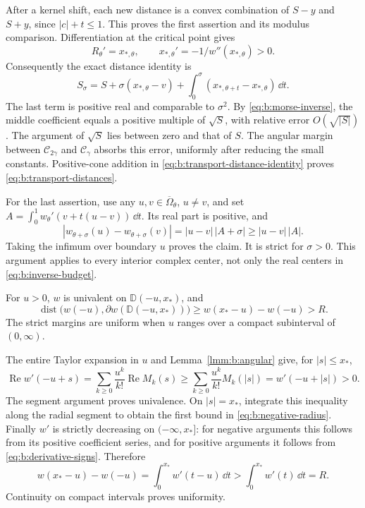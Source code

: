 \begin{prf}
After a kernel shift, each new distance is a convex combination
of $S-y$ and $S+y$, since $|c|+t\leq1$. This proves the first
assertion and its modulus comparison.
Differentiation at the critical point gives
\[
 R_\theta'=x_{*,\theta},\qquad
 x_{*,\theta}'=-1/w''(x_{*,\theta})>0.
\]
Consequently the exact distance identity is
\begin{equation}\label{eq:b:transport-distance-identity}
 S_\sigma=S+\sigma(x_{*,\theta}-v)
       +\int_0^\sigma(x_{*,\theta+t}-x_{*,\theta})\,\dd t.
\end{equation}
The last term is positive real and comparable to $\sigma^2$.
By \eqref{eq:b:morse-inverse}, the middle coefficient equals a
positive multiple of $\sqrt S$, with relative error $O(\sqrt{|S|})$.
The argument of $\sqrt S$ lies between zero and that of $S$.
The angular margin between $\mathcal C_{2\gamma}$ and
$\mathcal C_\gamma$ absorbs this error, uniformly after reducing
the small constants. Positive-cone addition in
\eqref{eq:b:transport-distance-identity} proves
\eqref{eq:b:transport-distances}.

For the last assertion, use any $u,v\in\overline\Omega_\theta$,
$u\ne v$, and set
$A=\int_0^1w_\theta'(v+t(u-v))\,\dd t$.
Its real part is positive, and
\[
 |w_{\theta+\sigma}(u)-w_{\theta+\sigma}(v)|
              =|u-v|\,|A+\sigma|\geq|u-v|\,|A|.
\]
Taking the infimum over boundary $u$ proves the claim. It is strict
for $\sigma>0$. This argument applies to every interior complex
center, not only the real centers in \eqref{eq:b:inverse-budget}.
\end{prf}

\begin{lmm}\label{lmm:b:negative-disks}
For $u>0$, $w$ is univalent on $\mathbb D(-u,x_*)$, and
\begin{equation}\label{eq:b:negative-radius}
 \operatorname{dist}\bigl(w(-u),
                   \partial w(\mathbb D(-u,x_*))\bigr)
 \geq w(x_*-u)-w(-u)>R.
\end{equation}
The strict margins are uniform when $u$ ranges over a compact
subinterval of $(0,\infty)$.
\end{lmm}
\begin{prf}
The entire Taylor expansion in $u$ and
Lemma~\ref{lmm:b:angular} give, for $|s|\leq x_*$,
\[
 \operatorname{Re}w'(-u+s)
 =\sum_{k\geq0}\frac{u^k}{k!}\operatorname{Re}M_k(s)
 \geq\sum_{k\geq0}\frac{u^k}{k!}M_k(|s|)
 =w'(-u+|s|)>0.
\]
The segment argument proves univalence. On $|s|=x_*$, integrate
this inequality along the radial segment to obtain the first bound
in \eqref{eq:b:negative-radius}. Finally $w'$ is strictly decreasing
on $(-\infty,x_*]$: for negative arguments this follows from its
positive coefficient series, and for positive arguments it follows
from \eqref{eq:b:derivative-signs}. Therefore
\[
 w(x_*-u)-w(-u)=\int_0^{x_*}w'(t-u)\,\dd t
                           >\int_0^{x_*}w'(t)\,\dd t=R.
\]
Continuity on compact intervals proves uniformity.
\end{prf}
